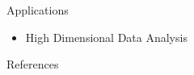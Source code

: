 \begin{frame}{Applications}
	\begin{itemize}[<+->]
		\item High Dimensional Data Analysis \cite{ghrist}
	\end{itemize}
	\begin{figure}[]
		\centering
		\caption{\cite{wagner}}
	\end{figure}
\end{frame}



\begin{frame}{References}
	
\end{frame}





